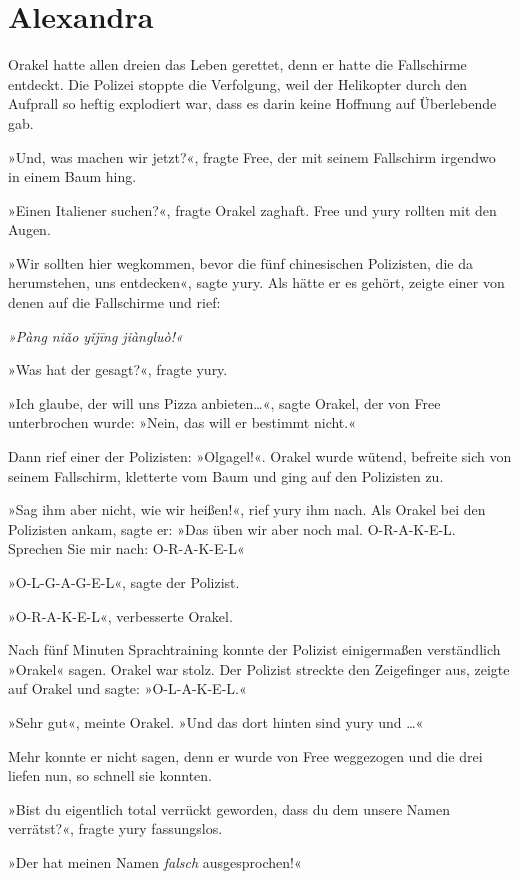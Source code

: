 \chapter{Alexandra}

Orakel hatte allen dreien das Leben gerettet, denn er hatte die Fallschirme entdeckt. Die Polizei stoppte die Verfolgung, weil der Helikopter durch den Aufprall so heftig explodiert war, dass es darin keine Hoffnung auf Überlebende gab.

»Und, was machen wir jetzt?«, fragte Free, der mit seinem Fallschirm irgendwo in einem Baum hing.

»Einen Italiener suchen?«, fragte Orakel zaghaft. Free und yury rollten mit den Augen.

»Wir sollten hier wegkommen, bevor die fünf chinesischen Polizisten, die da herumstehen, uns entdecken«, sagte yury. Als hätte er es gehört, zeigte einer von denen auf die Fallschirme und rief:

\textit{»Pàng niǎo yǐjīng jiàngluò!«}

»Was hat der gesagt?«, fragte yury.

»Ich glaube, der will uns Pizza anbieten…«, sagte Orakel, der von Free unterbrochen wurde: »Nein, das will er bestimmt nicht.«

Dann rief einer der Polizisten: »Olgagel!«. Orakel wurde wütend, befreite sich von seinem Fallschirm, kletterte vom Baum und ging auf den Polizisten zu.

»Sag ihm aber nicht, wie wir heißen!«, rief yury ihm nach. Als Orakel bei den Polizisten ankam, sagte er: »Das üben wir aber noch mal. O-R-A-K-E-L. Sprechen Sie mir nach: O-R-A-K-E-L«

»O-L-G-A-G-E-L«, sagte der Polizist.

»O-R-A-K-E-L«, verbesserte Orakel.

Nach fünf Minuten Sprachtraining konnte der Polizist einigermaßen verständlich »Orakel« sagen. Orakel war stolz. Der Polizist streckte den Zeigefinger aus, zeigte auf Orakel und sagte: »O-L-A-K-E-L.«

»Sehr gut«, meinte Orakel. »Und das dort hinten sind yury und …«

Mehr konnte er nicht sagen, denn er wurde von Free weggezogen und die drei liefen nun, so schnell sie konnten.

»Bist du eigentlich total verrückt geworden, dass du dem unsere Namen verrätst?«, fragte yury fassungslos.

»Der hat meinen Namen \textit{falsch} ausgesprochen!«

